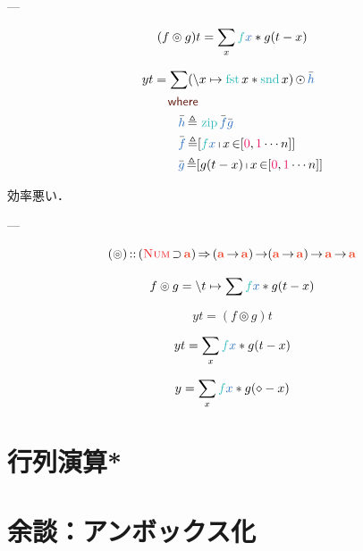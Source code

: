 \documentclass[a5paper,twoside,fleqn,draft]{jsbook}
\begin{document}

---

\begin{equation}
(f\circledcirc g)t=\sum_x\hFunc{f}\hVar{x}*g(t-x)
\end{equation}

\begin{equation}
\begin{aligned}
yt&=\sum(\hLambdaSyntax{x}{\mFst x*\mSnd x})\mMapList\hListVarWith{h}\\
&\quad\mWhere\\
&\qquad\hListVarWith{h}\mLetEq{}\mZipFunc\hListVarWith{f}\hListVarWith{g}\\
&\qquad\hListVarWith{f}\mLetEq[\hFunc{f}\hVar{x}\mListComp x\mFrom[\hConstant{0},\hConstant{1}\dotsb n]]\\
&\qquad\hListVarWith{g}\mLetEq[g(t-x)\mListComp x\mFrom[\hConstant{0},\hConstant{1}\dotsb n]]
\end{aligned}
\end{equation}

効率悪い．

---

\begin{equation}
(\circledcirc)\hIsTypeOf{}(\hNum\hHasElementsOf\mA )\hAndThen{}
\mProjEXP{
  (\mProjEXP{\mA }{\mA })
}
{
  \mProjEXP{(\mProjEXP{\mA }{\mA })}
  {\mProjEXP{\mA }{\mA }}
}
\end{equation}

\begin{equation}
f\circledcirc g=\hLambdaSyntax{t}{\sum \hFunc{f}\hVar{x}*g(t-x)}
\end{equation}


$$
yt=(f\circledcirc g)t
$$


$$
yt=\sum_x\hFunc{f}\hVar{x}*g(t-x)
$$

$$
y=\sum_x\hFunc{f}\hVar{x}*g(\hAnonParam-x)
$$

\section{行列演算*}



\section{余談：アンボックス化}
\end{document}

